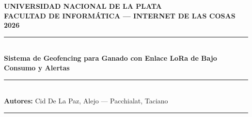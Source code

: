 \documentclass[11pt,a4paper]{article}
\begin{document}
\begin{center}
    {\bfseries\large UNIVERSIDAD NACIONAL DE LA PLATA} \\[0.1cm]
    {\bfseries\normalsize FACULTAD DE INFORMÁTICA --- INTERNET DE LAS COSAS 2026} \\[0.3cm]
    \rule{\textwidth}{0.8pt} \\[0.25cm]
    \vspace{0.2cm}
    {\bfseries\LARGE Sistema de Geofencing para Ganado con Enlace LoRa de Bajo Consumo y Alertas} \\[0.2cm]
    \rule{\textwidth}{0.4pt} \\[0.25cm]
    {\bfseries Autores:} Cid De La Paz, Alejo --- Pacchialat, Taciano \\[0.3cm]
\end{center}

\begin{abstract}
\noindent El presente informe técnico describe el diseño, arquitectura e implementación de una plataforma de monitoreo de ubicación y delimitación perimetral virtual (geofencing) para ganado bovino en entornos rurales sin cobertura de telefonía celular. El sistema articula nodos móviles de borde (collares) basados en microcontroladores ESP32 con receptores GPS y transceptores LoRa SX1278 a 433~MHz operando bajo ciclos estrictos de temporización en \textit{Deep Sleep}. Los paquetes de telemetría son capturados por una compuerta de enlace (\textit{Gateway}) ESP32 y retransmitidos vía MQTT e InfluxDB hacia un servidor local Node-RED y contenedores Docker. La verificación espacial punto-en-polígono (\textit{Ray-Casting}) y el control paramétrico se gestionan desde una interfaz de monitoreo y un bot bidireccional de Telegram con alertas proactivas.
\end{abstract}

\vspace{0.2cm}
\rule{\textwidth}{0.4pt}
\vspace{0.2cm}







\end{document}
